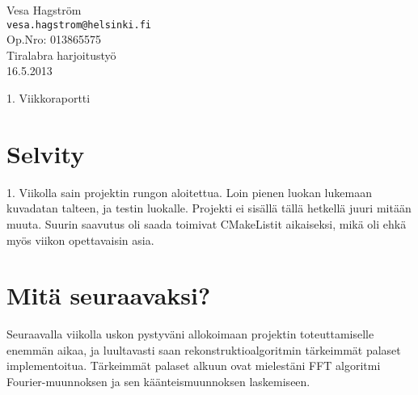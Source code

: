 \documentclass[12pt,a4paper]{report}
\author{Vesa Hagström}
\begin{document}
    \renewcommand{\bibname}{Viitteet}

	\begin{titlepage}
    \label{Title}
	\begin{flushleft}
		\hfill Vesa Hagström 											\\
		\hfill \texttt{vesa.hagstrom@helsinki.fi} 						\\
		\hfill Op.Nro: 013865575											\\
		\hfill Tiralabra harjoitustyö									\\
		\hfill 16.5.2013													\\
	\end{flushleft}

	\vfill

	\begin{center}
		\huge{1. Viikkoraportti}
	\end{center}

	\vfill

	\end{titlepage}

    \section*{Selvity}
    1. Viikolla sain projektin rungon aloitettua. Loin pienen luokan lukemaan kuvadatan talteen, ja testin luokalle. Projekti ei sisällä tällä hetkellä juuri mitään muuta. Suurin saavutus oli saada toimivat CMakeListit aikaiseksi, mikä oli ehkä myös viikon opettavaisin asia.
    
    \section*{Mitä seuraavaksi?}
    Seuraavalla viikolla uskon pystyväni allokoimaan projektin toteuttamiselle enemmän aikaa, ja luultavasti saan rekonstruktioalgoritmin tärkeimmät palaset implementoitua. Tärkeimmät palaset alkuun ovat mielestäni FFT algoritmi Fourier-muunnoksen ja sen käänteismuunnoksen laskemiseen.
    
\end{document}
